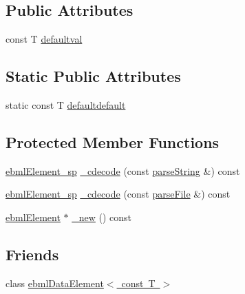 \subsection*{Public Attributes}
\begin{DoxyCompactItemize}
\item 
const T \mbox{\hyperlink{classebml_1_1ebmlDataElementClass_3_01const_01T_01_4_aea8b5f04ffa6327c211e20171d75fdcd}{defaultval}}
\end{DoxyCompactItemize}
\subsection*{Static Public Attributes}
\begin{DoxyCompactItemize}
\item 
static const T \mbox{\hyperlink{classebml_1_1ebmlDataElementClass_3_01const_01T_01_4_a4b0000068ea1cd6b05a45b038e47c436}{defaultdefault}}
\end{DoxyCompactItemize}
\subsection*{Protected Member Functions}
\begin{DoxyCompactItemize}
\item 
\mbox{\hyperlink{namespaceebml_adad533b7705a16bb360fe56380c5e7be}{ebml\+Element\+\_\+sp}} \mbox{\hyperlink{classebml_1_1ebmlDataElementClass_3_01const_01T_01_4_adfbb2c0872ea79aef9e769bf92a679ca}{\+\_\+cdecode}} (const \mbox{\hyperlink{classebml_1_1parseString}{parse\+String}} \&) const
\item 
\mbox{\hyperlink{namespaceebml_adad533b7705a16bb360fe56380c5e7be}{ebml\+Element\+\_\+sp}} \mbox{\hyperlink{classebml_1_1ebmlDataElementClass_3_01const_01T_01_4_a73cd60993aad76a5123f0f6c56b506dc}{\+\_\+cdecode}} (const \mbox{\hyperlink{classebml_1_1parseFile}{parse\+File}} \&) const
\item 
\mbox{\hyperlink{classebml_1_1ebmlElement}{ebml\+Element}} $\ast$ \mbox{\hyperlink{classebml_1_1ebmlDataElementClass_3_01const_01T_01_4_ac0f96ad77925a1236e1a637db0d5a356}{\+\_\+new}} () const
\end{DoxyCompactItemize}
\subsection*{Friends}
\begin{DoxyCompactItemize}
\item 
class \mbox{\hyperlink{classebml_1_1ebmlDataElementClass_3_01const_01T_01_4_a2cbdad6043a14b5d01294e19181e831c}{ebml\+Data\+Element$<$ const T $>$}}
\end{DoxyCompactItemize}


